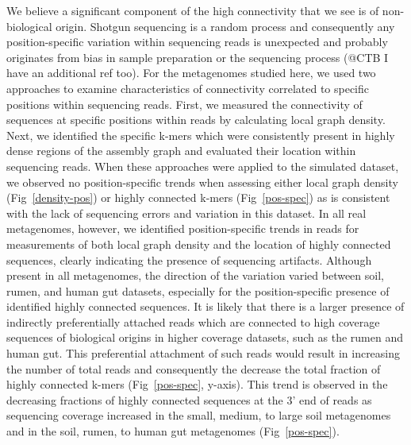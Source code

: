 \documentclass[10pt]{article}
\begin{document}


We believe a significant component of the high connectivity that we
see is of non-biological origin.  Shotgun sequencing is a random
process and consequently any position-specific variation within
sequencing reads is unexpected and probably originates from bias in
sample preparation or the sequencing process \cite{GomezAlvarez:2009p1334, Haas:2011jg, Keegan:2012p1336} (@CTB I have an additional ref too).  For the
metagenomes studied here, we used two approaches to examine
characteristics of connectivity correlated to specific positions
within sequencing reads.  First, we measured the connectivity of
sequences at specific positions within reads by calculating local
graph density.  Next, we identified the specific k-mers which were
consistently present in highly dense regions of the assembly graph and
evaluated their location within sequencing reads.  When these
approaches were applied to the simulated dataset, we observed no
position-specific trends when assessing either local graph density
(Fig~\ref{density-pos}) or highly connected k-mers (Fig~\ref{pos-spec}) as is
consistent with the lack of sequencing errors and variation in this
dataset.  In all real metagenomes, however, we identified
position-specific trends in reads for measurements of both local graph density
and the location of highly connected sequences, clearly indicating the
presence of sequencing artifacts.  Although present in all
metagenomes, the direction of the variation varied between soil,
rumen, and human gut datasets, especially for the position-specific
presence of identified highly connected sequences.  It is likely that
there is a larger presence of indirectly preferentially attached reads
which are connected to high coverage sequences of biological origins
in higher coverage datasets, such as the rumen and human gut.  This
preferential attachment of such reads would result in increasing the
number of total reads and consequently the decrease the total fraction
of highly connected k-mers (Fig~\ref{pos-spec}, y-axis).  This trend is observed
in the decreasing fractions of highly connected sequences at the 3'
end of reads as sequencing coverage increased in the small, medium, to
large soil metagenomes and in the soil, rumen, to human gut
metagenomes (Fig~\ref{pos-spec}).
\end{document}
